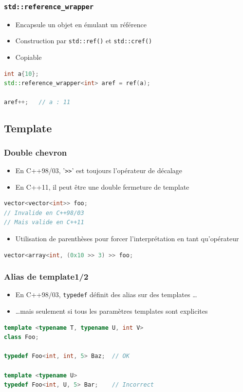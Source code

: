 \documentclass[C++.tex]{subfiles}
\begin{document}
\begin{frame}[fragile]
	\frametitle{\lstinline|std::reference_wrapper|}
	\begin{itemize}
		\item Encapsule un objet en émulant un référence
		\item Construction par \lstinline|std::ref()| et \lstinline|std::cref()|
		\item Copiable
	\end{itemize}

	\begin{lstlisting}[language=C++]
int a{10};
std::reference_wrapper<int> aref = ref(a);

aref++;   // a : 11\end{lstlisting}
\end{frame}

\subsection*{Template}
\begin{frame}[fragile]
	\frametitle{Double chevron}
	\begin{itemize}
		\item En C++98/03, '\lstinline|>>|' est toujours l'opérateur de décalage
		\item En C++11, il peut être une double fermeture de template
	\end{itemize}

	\begin{lstlisting}[language=C++]
vector<vector<int>> foo;
// Invalide en C++98/03
// Mais valide en C++11\end{lstlisting}


	\begin{itemize}
		\item Utilisation de parenthèses pour forcer l'interprétation en tant qu'opérateur
	\end{itemize}

	\begin{lstlisting}[language=C++]
vector<array<int, (0x10 >> 3) >> foo;\end{lstlisting}
\end{frame}

\begin{frame}[fragile]
	\frametitle{Alias de template\titlehfill{}1/2}
	\begin{itemize}
		\item En C++98/03, \lstinline|typedef| définit des alias sur des templates \ldots
		\item \ldots mais seulement si tous les paramètres templates sont explicites
	\end{itemize}

	\begin{lstlisting}[language=C++]
template <typename T, typename U, int V>
class Foo;

typedef Foo<int, int, 5> Baz;  // OK

template <typename U>
typedef Foo<int, U, 5> Bar;    // Incorrect\end{lstlisting}
\end{frame}
\end{document}
